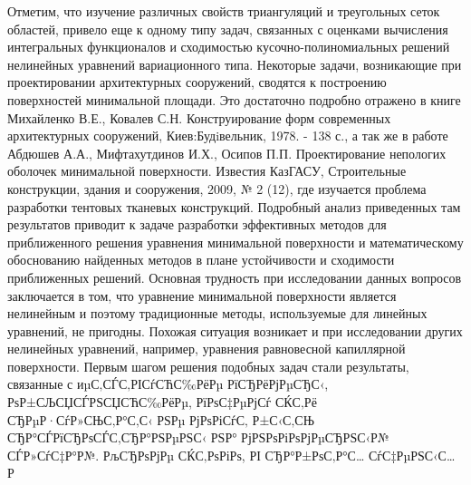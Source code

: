 \documentclass[a4paper,11pt,twoside]{article}
\begin{document}
Отметим, что изучение различных свойств триангуляций и треугольных сеток областей, привело еще к одному типу задач, связанных с оценками вычисления интегральных функционалов и сходимостью кусочно-полиномиальных решений нелинейных уравнений вариационного типа. Некоторые задачи, возникающие при проектировании архитектурных сооружений, сводятся к построению поверхностей минимальной площади. Это достаточно подробно отражено в  книге  Михайленко В.Е.,  Ковалев С.Н.  Конструирование форм современных архитектурных сооружений,  Киев:Будiвельник, 1978. - 138 с., а так же в работе Абдюшев А.А., Мифтахутдинов И.Х., Осипов П.П.   Проектирование непологих оболочек минимальной поверхности. Известия КазГАСУ, Строительные конструкции, здания и сооружения, 2009, № 2 (12), где  изучается проблема разработки тентовых тканевых конструкций. Подробный анализ приведенных там результатов   приводит к задаче разработки эффективных методов для приближенного решения уравнения минимальной поверхности и математическому обоснованию найденных методов в плане устойчивости и сходимости приближенных решений. Основная трудность при исследовании данных вопросов заключается в том, что уравнение минимальной поверхности является нелинейным и поэтому традиционные методы, используемые для линейных уравнений,  не пригодны. Похожая ситуация возникает и  при исследовании других нелинейных уравнений, например, уравнения равновесной капиллярной поверхности.   
Первым шагом решения подобных задач стали результаты, связанные с иµС‚СЃС‚РІСѓСЋС‰РёРµ РїСЂРёРјРµСЂС‹, РѕР±СЉСЏСЃРЅСЏСЋС‰РёРµ, РїРѕС‡РµРјСѓ СЌС‚Рё СЂРµР·СѓР»СЊС‚Р°С‚С‹ РЅРµ РјРѕРіСѓС‚ Р±С‹С‚СЊ СЂР°СЃРїСЂРѕСЃС‚СЂР°РЅРµРЅС‹ РЅР° РјРЅРѕРіРѕРјРµСЂРЅС‹Р№ СЃР»СѓС‡Р°Р№. РљСЂРѕРјРµ СЌС‚РѕРіРѕ, РІ СЂР°Р±РѕС‚Р°С… СѓС‡РµРЅС‹С… Р
\end{document}
